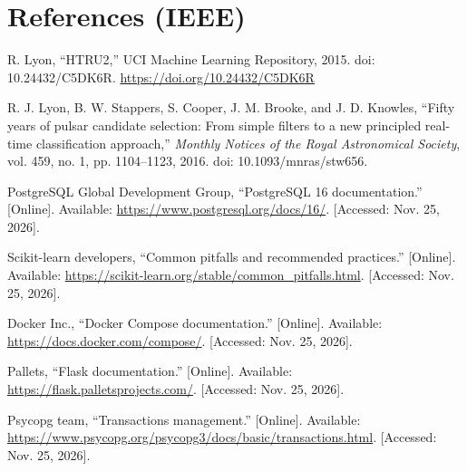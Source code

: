 \documentclass[11pt,a4paper]{article}
\begin{document}
\section*{References (IEEE)}
\begin{enumerate}[label={[\arabic*]},leftmargin=1cm]
\item R. Lyon, ``HTRU2,'' UCI Machine Learning Repository, 2015. doi: 10.24432/C5DK6R. \url{https://doi.org/10.24432/C5DK6R}
\item R. J. Lyon, B. W. Stappers, S. Cooper, J. M. Brooke, and J. D. Knowles, ``Fifty years of pulsar candidate selection: From simple filters to a new principled real-time classification approach,'' \textit{Monthly Notices of the Royal Astronomical Society}, vol. 459, no. 1, pp. 1104--1123, 2016. doi: 10.1093/mnras/stw656.
\item PostgreSQL Global Development Group, ``PostgreSQL 16 documentation.'' [Online]. Available: \url{https://www.postgresql.org/docs/16/}. [Accessed: Nov. 25, 2026].
\item Scikit-learn developers, ``Common pitfalls and recommended practices.'' [Online]. Available: \url{https://scikit-learn.org/stable/common_pitfalls.html}. [Accessed: Nov. 25, 2026].
\item Docker Inc., ``Docker Compose documentation.'' [Online]. Available: \url{https://docs.docker.com/compose/}. [Accessed: Nov. 25, 2026].
\item Pallets, ``Flask documentation.'' [Online]. Available: \url{https://flask.palletsprojects.com/}. [Accessed: Nov. 25, 2026].
\item Psycopg team, ``Transactions management.'' [Online]. Available: \url{https://www.psycopg.org/psycopg3/docs/basic/transactions.html}. [Accessed: Nov. 25, 2026].
\end{enumerate}
\end{document}
